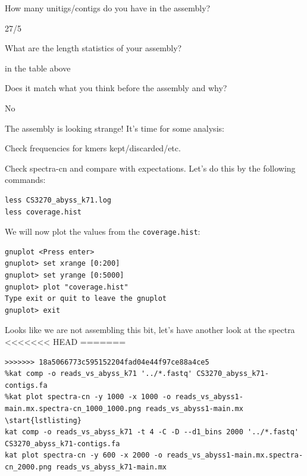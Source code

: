 \begin{questions}
How many unitigs/contigs do you have in the assembly? \\
\begin{answer}
27/5 \\
\end{answer}
What are the length statistics of your assembly? \\
\begin{answer}
in the table above \\
\end{answer}
Does it match what you think before the assembly and why? \\
\begin{answer}
No \\
\end{answer}

\end{questions}


\begin{steps}
The assembly is looking strange! It's time for some analysis:

\item Check frequencies for kmers kept/discarded/etc.
\item Check spectra-cn and compare with expectations.
Let's do this by the following commands:

\begin{lstlisting}
less CS3270_abyss_k71.log 
less coverage.hist
\end{lstlisting}
\end{steps}

\begin{steps}
We will now plot the values from the \texttt{coverage.hist}:
\begin{lstlisting}
gnuplot <Press enter>
gnuplot> set xrange [0:200]
gnuplot> set yrange [0:5000]
gnuplot> plot "coverage.hist"
Type exit or quit to leave the gnuplot
gnuplot> exit
\end{lstlisting}
\end{steps}


\begin{steps}
Looks like we are not assembling this bit, let's have another look at the spectra
<<<<<<< HEAD
=======
\begin{lstlisting}
>>>>>>> 18a5066773c595152204fad04e44f97ce88a4ce5
%kat comp -o reads_vs_abyss_k71 '../*.fastq' CS3270_abyss_k71-contigs.fa
%kat plot spectra-cn -y 1000 -x 1000 -o reads_vs_abyss1-main.mx.spectra-cn_1000_1000.png reads_vs_abyss1-main.mx
\start{lstlisting}
kat comp -o reads_vs_abyss_k71 -t 4 -C -D --d1_bins 2000 '../*.fastq' CS3270_abyss_k71-contigs.fa
kat plot spectra-cn -y 600 -x 2000 -o reads_vs_abyss1-main.mx.spectra-cn_2000.png reads_vs_abyss_k71-main.mx

\end{lstlisting}
\end{steps}

